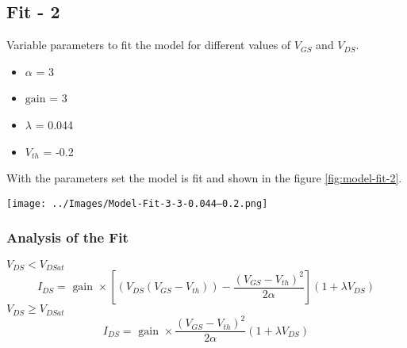 \documentclass{article}
\begin{document}
\subsection{Fit - 2}
Variable parameters to fit the model for different values of $V_{GS}$ and $V_{DS}$. 
\begin{itemize}
    \item $\alpha$ = 3
    \item $\text{gain}$ = 3
    \item $\lambda$ = 0.044
    \item $V_{th}$ = -0.2
\end{itemize}
With the parameters set the model is fit and shown in the figure \ref{fig:model-fit-2}.
\begin{center}
    \label{fig:model-fit-2}
    \texttt{[image: ../Images/Model-Fit-3-3-0.044--0.2.png]}
\end{center}
\subsubsection{Analysis of the Fit}
\textbf{$V_{DS}< V_{DSat}$}
\begin{equation}
    I_{DS} = \text{ gain }\times \left[(V_{DS}(V_{GS}-V_{th})) - \frac{(V_{GS}-V_{th})^2}{2 \alpha}\right](1 + \lambda V_{DS})
\end{equation}
\textbf{$V_{DS}\geq V_{DSat}$}
\begin{equation}
    I_{DS} =\text{ gain }\times \frac{(V_{GS}-V_{th})^2}{2\alpha} (1 + \lambda V_{DS})
\end{equation}
\newpage
\end{document}
